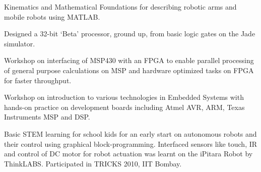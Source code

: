 \documentclass[]{deedy-resume-openfont}
\begin{document}
Kinematics and Mathematical Foundations for describing robotic arms and mobile robots using MATLAB.

\sectionsep

 Designed a 32-bit ‘Beta’ processor, ground up, from basic logic gates on the Jade simulator.

\sectionsep

 Workshop on interfacing of MSP430 with an FPGA to enable parallel processing of general purpose calculations on MSP and hardware optimized tasks on FPGA for faster throughput.
\sectionsep

 Workshop on introduction to various technologies in Embedded Systems with	hands-on practice on development boards including Atmel AVR, ARM, Texas Instruments MSP and DSP.

\sectionsep

Basic STEM learning for school kids for an early start on autonomous robots and their control using graphical block-programming. Interfaced sensors like touch, IR and control of DC motor for robot actuation was learnt on the iPitara Robot by ThinkLABS. Participated in TRICKS 2010, IIT Bombay.
\sectionsep




%
%
\end{document}
